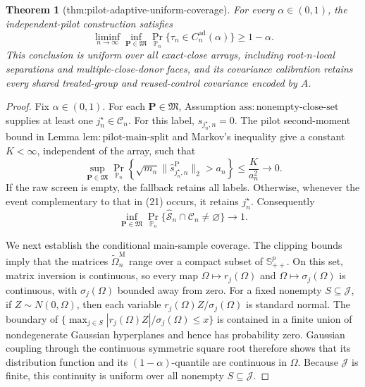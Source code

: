 \documentclass{article}
\newtheorem{theorem}{Theorem}
\begin{document}
\begin{theorem}[thm:pilot-adaptive-uniform-coverage]\label{thm:pilot-adaptive-uniform-coverage}
For every \(\alpha\in(0,1)\), the independent-pilot construction satisfies
\[
 \liminf_{n\to\infty}\inf_{\mathbf P\in\mathfrak M}
 \Pr_{\mathbb P_n}\{\tau_n\in C_n^{\mathrm{ad}}(\alpha)\}
 \ge1-\alpha.
\]
This conclusion is uniform over all exact-close arrays, including root-\(n\)-local separations and multiple-close-donor faces, and its covariance calibration retains every shared treated-group and reused-control covariance encoded by \(A\).
\end{theorem}
\begin{proof}
Fix \(\alpha\in(0,1)\).  For each \(\mathbf P\in\mathfrak M\), Assumption \(\mathrm{ass:nonempty\text{-}close\text{-}set}\) supplies at least one \(j_n^\star\in\mathcal C_n\).  For this label, \(s_{j_n^\star,n}=0\).  The pilot second-moment bound in Lemma \(\mathrm{lem:pilot\text{-}main\text{-}split}\) and Markov's inequality give a constant \(K<\infty\), independent of the array, such that
\[
 \sup_{\mathbf P\in\mathfrak M}
 \Pr_{\mathbb P_n}\!\left\{
 \sqrt{m_n}\|\widehat s_{j_n^\star,n}^{\mathrm P}\|_2>a_n
 \right\}
 \le \frac K{a_n^2}\longrightarrow0.
\tag{21}
\]
If the raw screen is empty, the fallback retains all labels.  Otherwise, whenever the event complementary to that in (21) occurs, it retains \(j_n^\star\).  Consequently
\[
 \inf_{\mathbf P\in\mathfrak M}
 \Pr_{\mathbb P_n}\{\widehat{\mathcal S}_n\cap\mathcal C_n\ne\varnothing\}
 \longrightarrow1.
\tag{22}
\]

We next establish the conditional main-sample coverage.  The clipping bounds imply that the matrices \(\widetilde\Omega_n^{\mathrm M}\) range over a compact subset of \(\mathbb S_{++}^p\).  On this set, matrix inversion is continuous, so every map \(\Omega\mapsto r_j(\Omega)\) and \(\Omega\mapsto\sigma_j(\Omega)\) is continuous, with \(\sigma_j(\Omega)\) bounded away from zero.  For a fixed nonempty \(S\subseteq\mathcal J\), if \(Z\sim N(0,\Omega)\), then each variable \(r_j(\Omega)Z/\sigma_j(\Omega)\) is standard normal.  The boundary of
\(
 \{\max_{j\in S}|r_j(\Omega)Z|/\sigma_j(\Omega)\le x\}
\)
is contained in a finite union of nondegenerate Gaussian hyperplanes and hence has probability zero.  Gaussian coupling through the continuous symmetric square root therefore shows that its distribution function and its \((1-\alpha)\)-quantile are continuous in \(\Omega\).  Because \(\mathcal J\) is finite, this continuity is uniform over all nonempty \(S\subseteq\mathcal J\).


\end{proof}
\end{document}
